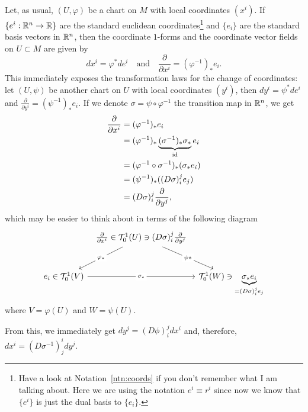 \begin{example}
  Let, as usual, $(U,\varphi)$ be a chart on $M$ with local coordinates $(x^i)$.
  If $\{e^i:\mathbb{R}^n\to\mathbb{R}\}$ are the standard euclidean coordinates\footnote{Have a look at Notation~\ref{ntn:coords} if you don't remember what I am talking about.
    Here we are using the notation $e^i \equiv r^i$ since now we know that $\{e^i\}$ is just the dual basis to $\{e_i\}$. } and $\{e_i\}$ are the standard basis vectors in $\mathbb{R}^n$, then the coordinate $1$-forms and the coordinate vector fields on $U\subset M$ are given by
  \begin{equation}
    dx^i = \varphi^* de^i
    \quad\mbox{and}\quad
    \frac{\partial}{\partial x^i} = (\varphi^{-1})_* e_i.
  \end{equation}
  This immediately exposes the transformation laws for the change of coordinates: let $(U, \psi)$ be another chart on $U$ with local coordinates $(y^i)$, then $dy^i = \psi^* de^i$ and $\frac{\partial}{\partial y^i} = (\psi^{-1})_* e_i$. If we denote $\sigma = \psi\circ\varphi^{-1}$ the transition map in $\mathbb{R}^n$, we get
  \begin{align}
    \frac{\partial}{\partial x^i} & = (\varphi^{-1})_* e_i                                                 \\
                                  & = (\varphi^{-1})_* \LaTeXunderbrace{(\sigma^{-1})_*\sigma_*}_{\id} e_i \\
                                  & = (\varphi^{-1}\circ \sigma^{-1})_* (\sigma_* e_i)                     \\
                                  & = (\psi^{-1})_* ((D\sigma)_i^j e_j)                                    \\
                                  & = (D\sigma)_i^j \frac{\partial}{\partial y^j},
  \end{align}
  which may be easier to think about in terms of the following diagram
  \begin{equation}\nonumber
    \begin{tikzcd}[row sep=large, column sep=tiny]
      & \frac{\partial}{\partial x^i} \in \cT_0^1(U) \ni (D\sigma)_i^j \frac{\partial}{\partial y^j} \arrow[dl, "\varphi_*" description] \arrow[dr, "\psi*" description] & \\
      e_i \in \cT_0^1(V) \arrow[rr, "\sigma_*" description] & & \cT_0^1(W) \ni \LaTeXunderbrace{\sigma_* e_i}_{= (D\sigma)_i^j e_j}
    \end{tikzcd}
  \end{equation}
  where $V = \varphi(U)$ and $W = \psi(U)$.

  From this, we immediately get $dy^j = (D\phi)_i^j dx^i$ and, therefore, $dx^i =  (D\sigma^{-1})_j^i dy^j$.
\end{example}

